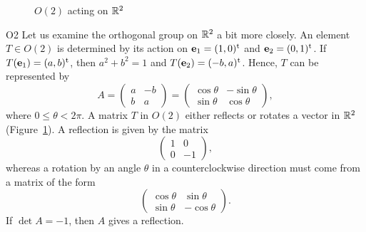  
 
\begin{figure}[htb]

\begin{center}
\end{center}

\caption{$O(2)$ acting on ${\Bbb R}^2$}
\label{O2}
\end{figure}
 
\begin{example}{O2}
Let us examine the orthogonal group  on ${\Bbb R}^2$ a bit more
closely.  An element $T \in O(2)$ is determined by its action on
${\bold e}_1 = (1, 0)^{\rm t}$ and ${\bold e}_2 = (0, 1)^{\rm t}$. If
$T({\bold e}_1) = (a,b)^{\rm t}$, then $a^2 + b^2 = 1$ and $T({\bold
e}_2) = (-b, a)^{\rm t}$. Hence, $T$ can be represented by 
\[
A
=
\begin{pmatrix}
a & -b \\
b & a
\end{pmatrix}
=
\begin{pmatrix}
\cos \theta & - \sin \theta \\
\sin \theta & \cos \theta
\end{pmatrix},
\]
where $0 \leq \theta < 2 \pi$. A matrix $T$ in $O(2)$ either reflects
or rotates a vector in ${\Bbb R}^2$ (Figure~\ref{O2}). A reflection is
given by the matrix 
\[
\begin{pmatrix}
1 & 0 \\
0 & -1
\end{pmatrix},
\]
whereas a rotation by an angle $\theta$ in a counterclockwise direction
must come from a matrix of the form 
\[
\begin{pmatrix}
\cos \theta & \sin \theta \\
\sin \theta & -\cos \theta
\end{pmatrix}.
\]
If $\det A =-1$, then $A$ gives a reflection.
\end{example}
 

